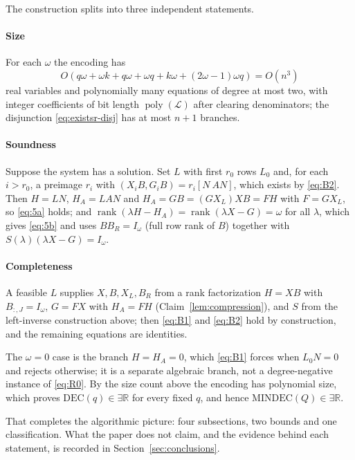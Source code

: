 \documentclass[journal]{IEEEtran}
\theoremstyle{plainn}
\theoremstyle{remark}
\begin{document}
The construction splits into three independent statements.

\paragraph*{Size}
For each $\omega$ the encoding has
\begin{equation*}
O(q\omega+\omega k+q\omega+\omega q+k\omega+(2\omega-1)\omega q)=O(n^3)
\end{equation*}
real variables and polynomially many equations of degree at most two, with integer coefficients of bit
length $\operatorname{poly}(\mathcal L)$ after clearing denominators; the disjunction
\eqref{eq:existsr-disj} has at most $n+1$ branches.

\paragraph*{Soundness}
Suppose the system has a solution. Set $L$ with first $r_0$ rows $L_0$ and, for each $i>r_0$, a preimage $r_i$ with $(X_iB,G_iB)=r_i[N\ AN]$, which exists by \eqref{eq:B2}. Then $H=LN$, $H_A=LAN$ and $H_A=GB=(GX_L)XB=FH$ with $F=GX_L$, so \eqref{eq:5a} holds; and $\operatorname{rank}(\lambda H-H_A)=\operatorname{rank}(\lambda X-G)=\omega$ for all $\lambda$, which gives \eqref{eq:5b} and uses $BB_R=I_\omega$ (full row rank of $B$) together with $S(\lambda)(\lambda X-G)=I_\omega$.

\paragraph*{Completeness}
A feasible $L$ supplies $X,B,X_L,B_R$ from a rank factorization $H=XB$ with $B_{:,J}=I_\omega$, $G=FX$ with $H_A=FH$ (Claim~\ref{lem:compression}), and $S$ from the left-inverse construction above; then \eqref{eq:B1} and \eqref{eq:B2} hold by construction, and the remaining equations are identities.

The $\omega=0$ case is the branch $H=H_A=0$, which \eqref{eq:B1} forces when $L_0N=0$ and rejects
otherwise; it is a separate algebraic branch, not a degree-negative instance of \eqref{eq:R0}. By the
size count above the encoding has polynomial size, which proves $\mathrm{DEC}(q)\in\exists\mathbb R$
for every fixed $q$, and hence $\mathrm{MINDEC}(Q)\in\exists\mathbb R$.

That completes the algorithmic picture: four subsections, two bounds and one classification. What the
paper does not claim, and the evidence behind each statement, is recorded in Section~\ref{sec:conclusions}.
\end{document}
